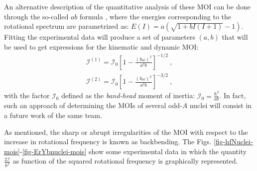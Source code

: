 An alternative description of the quantitative analysis of these MOI can be done through the so-called $ab$ formula \cite{wu1992relation,wu1992spin}, where the energies corresponding to the rotational spectrum are parametrized as: $E(I)=a\left(\sqrt{1+bI(I+1)}-1\right)$. Fitting the experimental data will produce a set of parameters $(a,b)$ that will be used to get expressions for the kinematic and dynamic MOI:
\begin{align}
    \mathcal{I}^{(1)}=\mathcal{I}_0\left[1-\frac{(\hbar\omega)^2}{a^2b}\right]^{-1/2}\ ,\\
    \mathcal{I}^{(2)}=\mathcal{I}_0\left[1-\frac{(\hbar\omega)^2}{a^2b}\right]^{-3/2}\ ,
\end{align}
with the factor $\mathcal{I}_0$ defined as the \emph{band-head} moment of inertia: $\mathcal{I}_0=\frac{\hbar^2}{ab}$. In fact, such an approach of determining the MOIs of several odd-$A$ nuclei will consist in a future work of the same team.

As mentioned, the sharp or abrupt irregularities of the MOI with respect to the increase in rotational frequency is known as backbending. The Figs. \ref{fig-hfNuclei-mois}-\ref{fig-ErYbnuclei-mois} show some experimental data in which the quantity $\frac{2\mathcal{I}}{\hbar^2}$ as function of the squared rotational frequency is graphically represented.

